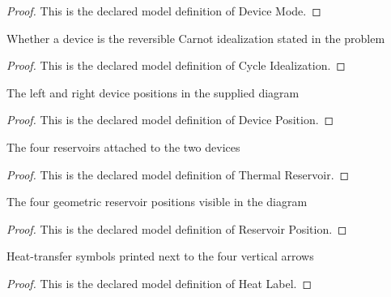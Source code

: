 \begin{proof}
  This is the declared model definition of Device Mode.
\end{proof}
\begin{definition}
  \label{def:physics:phyx-mini-0424:phyxminiproblems-problemphyxmini0424-cycleidealization}
  Whether a device is the reversible Carnot idealization stated in the problem
\end{definition}
\begin{proof}
  This is the declared model definition of Cycle Idealization.
\end{proof}
\begin{definition}
  \label{def:physics:phyx-mini-0424:phyxminiproblems-problemphyxmini0424-deviceposition}
  The left and right device positions in the supplied diagram
\end{definition}
\begin{proof}
  This is the declared model definition of Device Position.
\end{proof}
\begin{definition}
  \label{def:physics:phyx-mini-0424:phyxminiproblems-problemphyxmini0424-thermalreservoir}
  The four reservoirs attached to the two devices
\end{definition}
\begin{proof}
  This is the declared model definition of Thermal Reservoir.
\end{proof}
\begin{definition}
  \label{def:physics:phyx-mini-0424:phyxminiproblems-problemphyxmini0424-reservoirposition}
  The four geometric reservoir positions visible in the diagram
\end{definition}
\begin{proof}
  This is the declared model definition of Reservoir Position.
\end{proof}
\begin{definition}
  \label{def:physics:phyx-mini-0424:phyxminiproblems-problemphyxmini0424-heatlabel}
  Heat-transfer symbols printed next to the four vertical arrows
\end{definition}
\begin{proof}
  This is the declared model definition of Heat Label.
\end{proof}
